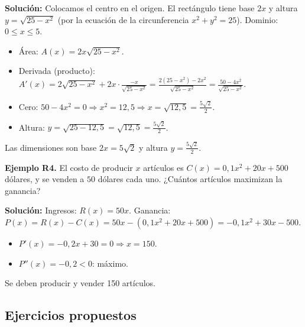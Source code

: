 \documentclass[12pt, a4paper]{article}
\begin{document}
\begin{cuadrosolucion}
  \textbf{Solución:} Colocamos el centro en el origen. El rectángulo tiene base $2x$ y altura $y = \sqrt{25 - x^2}$ (por la ecuación de la circunferencia $x^2 + y^2 = 25$). Dominio: $0 \le x \le 5$.
  \begin{itemize}
    \item Área: $A(x) = 2x\sqrt{25 - x^2}$.
    \item Derivada (producto): $A'(x) = 2\sqrt{25 - x^2} + 2x \cdot \frac{-x}{\sqrt{25 - x^2}} = \frac{2(25 - x^2) - 2x^2}{\sqrt{25 - x^2}} = \frac{50 - 4x^2}{\sqrt{25 - x^2}}$.
    \item Cero: $50 - 4x^2 = 0 \Rightarrow x^2 = 12{,}5 \Rightarrow x = \sqrt{12{,}5} = \frac{5\sqrt{2}}{2}$.
    \item Altura: $y = \sqrt{25 - 12{,}5} = \sqrt{12{,}5} = \frac{5\sqrt{2}}{2}$.
  \end{itemize}
  Las dimensiones son base $2x = 5\sqrt{2}$ y altura $y = \frac{5\sqrt{2}}{2}$.
\end{cuadrosolucion}

\newpage

\textbf{Ejemplo R4.} El costo de producir $x$ artículos es $C(x) = 0{,}1x^2 + 20x + 500$ dólares, y se venden a $50$ dólares cada uno. ¿Cuántos artículos maximizan la ganancia?

\begin{cuadrosolucion}
  \textbf{Solución:} Ingresos: $R(x) = 50x$. Ganancia: $P(x) = R(x) - C(x) = 50x - (0{,}1x^2 + 20x + 500) = -0{,}1x^2 + 30x - 500$.
  \begin{itemize}
    \item $P'(x) = -0{,}2x + 30 = 0 \Rightarrow x = 150$.
    \item $P''(x) = -0{,}2 < 0$: máximo.
  \end{itemize}
  Se deben producir y vender 150 artículos.
\end{cuadrosolucion}


\subsection{Ejercicios propuestos}
\end{document}
